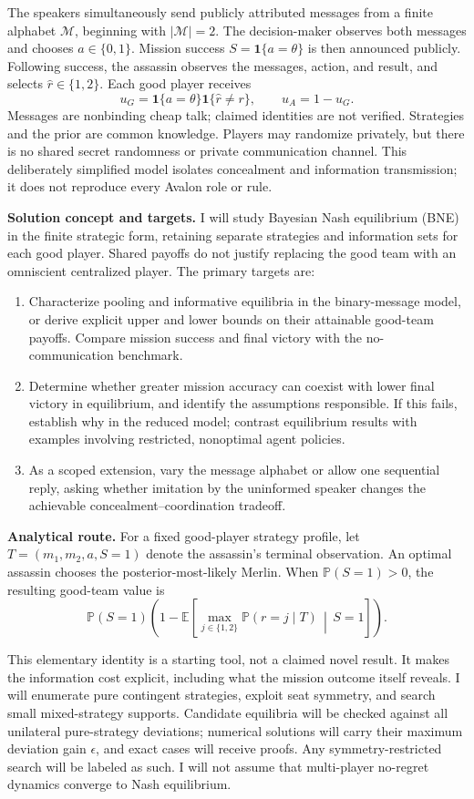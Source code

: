 \documentclass[11pt,letterpaper]{article}
\newcommand{\E}{\mathbb{E}}
\newcommand{\Prb}{\mathbb{P}}
\begin{document}
The speakers simultaneously send publicly attributed messages from a finite alphabet $\mathcal M$, beginning with $|\mathcal M|=2$. The decision-maker observes both messages and chooses $a\in\{0,1\}$. Mission success $S=\mathbf{1}\{a=\theta\}$ is then announced publicly. Following success, the assassin observes the messages, action, and result, and selects $\hat r\in\{1,2\}$. Each good player receives
\[
u_G=\mathbf{1}\{a=\theta\}\mathbf{1}\{\hat r\ne r\},
\qquad u_A=1-u_G.
\]
Messages are nonbinding cheap talk; claimed identities are not verified. Strategies and the prior are common knowledge. Players may randomize privately, but there is no shared secret randomness or private communication channel. This deliberately simplified model isolates concealment and information transmission; it does not reproduce every Avalon role or rule.

\textbf{Solution concept and targets.} I will study Bayesian Nash equilibrium (BNE) in the finite strategic form, retaining separate strategies and information sets for each good player. Shared payoffs do not justify replacing the good team with an omniscient centralized player. The primary targets are:
\begin{enumerate}
\item Characterize pooling and informative equilibria in the binary-message model, or derive explicit upper and lower bounds on their attainable good-team payoffs. Compare mission success and final victory with the no-communication benchmark.
\item Determine whether greater mission accuracy can coexist with lower final victory in equilibrium, and identify the assumptions responsible. If this fails, establish why in the reduced model; contrast equilibrium results with examples involving restricted, nonoptimal agent policies.
\item As a scoped extension, vary the message alphabet or allow one sequential reply, asking whether imitation by the uninformed speaker changes the achievable concealment--coordination tradeoff.
\end{enumerate}

\begin{samepage}
\textbf{Analytical route.} For a fixed good-player strategy profile, let $T=(m_1,m_2,a,S=1)$ denote the assassin's terminal observation. An optimal assassin chooses the posterior-most-likely Merlin. When $\Prb(S=1)>0$, the resulting good-team value is
\[
\Prb(S=1)\left(1-\E\!\left[\max_{j\in\{1,2\}}
\Prb(r=j\mid T)\,\middle|\, S=1\right]\right).
\]
\end{samepage}
This elementary identity is a starting tool, not a claimed novel result. It makes the information cost explicit, including what the mission outcome itself reveals. I will enumerate pure contingent strategies, exploit seat symmetry, and search small mixed-strategy supports. Candidate equilibria will be checked against all unilateral pure-strategy deviations; numerical solutions will carry their maximum deviation gain $\epsilon$, and exact cases will receive proofs. Any symmetry-restricted search will be labeled as such. I will not assume that multi-player no-regret dynamics converge to Nash equilibrium.
\end{document}
